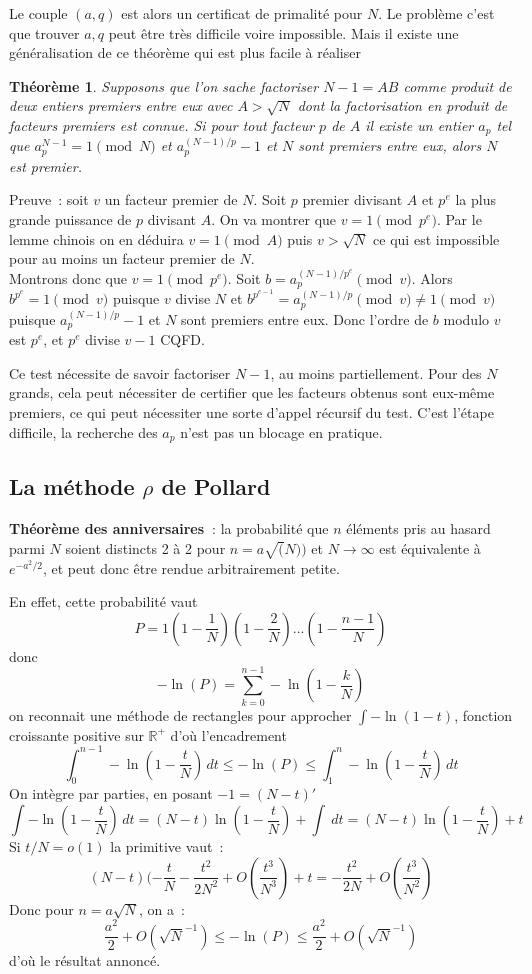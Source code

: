 \documentclass[a4paper,11pt]{article}
\newtheorem{thm}{Théorème}
\newcommand{\R}{{\mathbb{R}}}
\begin{document}
\begin{giacjshere}
Le couple $(a,q)$ est alors un certificat de primalit\'e pour $N$.
Le probl\`eme c'est que trouver $a,q$ peut \^etre tr\`es difficile
voire impossible. Mais il existe une g\'en\'eralisation de ce
th\'eor\`eme qui est plus facile \`a r\'ealiser
\begin{thm}
Supposons que l'on sache factoriser $N-1=AB$ comme produit de deux entiers
premiers entre eux avec $A>\sqrt{N}$ dont la factorisation en produit
de facteurs premiers est connue. Si pour tout facteur $p$ de $A$ il
existe un entier $a_p$ tel que $a_p^{N-1}=1 \pmod N$ et
$a_p^{(N-1)/p}-1$ et $N$ sont premiers entre eux, alors $N$ est premier.
\end{thm}
Preuve~: soit $v$ un facteur premier de $N$. 
Soit $p$ premier divisant $A$ et $p^e$ la plus grande
puissance de $p$ divisant $A$. On va montrer que $v=1 \pmod{p^e}$.
Par le lemme chinois on en d\'eduira $v=1 \pmod A$ puis $v>\sqrt{N}$
ce qui est impossible pour au moins un facteur premier de $N$.\\
Montrons donc que $v=1 \pmod{p^e}$. Soit $b=a_p^{(N-1)/p^e} \pmod v$. Alors $b^{p^e}=1 \pmod v$
puisque $v$ divise $N$ et $b^{p^{e-1}} = a_p^{(N-1)/p} \pmod v \neq 1
\pmod v$ puisque $a_p^{(N-1)/p}-1$ et $N$ sont premiers entre eux.
Donc l'ordre de $b$ modulo $v$ est $p^e$, et $p^e$ divise $v-1$ CQFD.

Ce test n\'ecessite de savoir factoriser $N-1$, au moins
partiellement. Pour des $N$ grands, cela peut n\'ecessiter
de certifier que les facteurs obtenus sont eux-m\^eme premiers,
ce qui peut n\'ecessiter une sorte d'appel r\'ecursif du test. C'est
l'\'etape difficile, la recherche des $a_p$ n'est pas un blocage en pratique.

\subsection{La m\'ethode $\rho$ de Pollard} 
{\bf Théorème des anniversaires~}: la probabilit\'e que $n$ éléments pris au
hasard parmi $N$ soient distincts 2 à 2 pour 
$n=a \sqrt(N))$ et $N\rightarrow \infty$ 
est \'equivalente \`a $e^{-a^2/2}$, 
et peut donc être rendue arbitrairement petite.

En effet, cette probabilit\'e vaut
$$ P=1(1-\frac1N)(1-\frac2N)...(1-\frac{n-1}{N})$$
donc
$$ -\ln(P)=\sum_{k=0}^{n-1} -\ln(1-\frac{k}{N})  $$
on reconnait une m\'ethode de rectangles pour approcher $\int
-\ln(1-t)$, fonction croissante positive sur $\R^+$ d'o\`u l'encadrement
$$ \int_{0}^{n-1} -\ln(1-\frac{t}{N}) \, dt \leq -\ln(P) \leq
\int_{1}^{n} -\ln(1-\frac{t}{N})  \, dt $$
On int\`egre par parties, en posant $-1=(N-t)'$ 
$$ \int -\ln(1-\frac{t}{N}) \, dt 
= (N-t) \ln(1-\frac{t}{N}) + \int \ dt 
= (N-t) \ln(1-\frac{t}{N}) + t $$
Si $t/N=o(1)$ la primitive vaut~:
$$ (N-t)(-\frac{t}{N}-\frac{t^2}{2N^2}+O(\frac{t^3}{N^3})+t
=-\frac{t^2}{2N} + O(\frac{t^3}{N^2}) $$
Donc pour $n=a\sqrt{N}$, on a~:
$$ \frac{a^2}{2}+ O(\sqrt{N}^{-1})
\leq -\ln(P) 
\leq \frac{a^2}{2}+ O(\sqrt{N}^{-1})$$
d'o\`u le r\'esultat annonc\'e.


\end{giacjshere}
\end{document}
